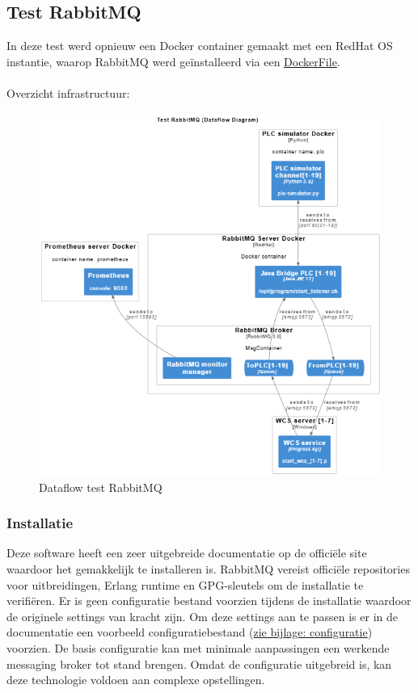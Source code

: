 \subsection{Test RabbitMQ}
In deze test werd opnieuw een Docker container gemaakt met een RedHat OS instantie, waarop RabbitMQ 
werd geïnstalleerd via een \hyperref[listing:docker_rabbitmq]{DockerFile}.
\\\\
Overzicht infrastructuur:
\begin{figure}[!h]
  \centering
  \includegraphics[width=.95\textwidth]{img/test-rabbitmq-dataflow.png}
  \caption{\label{fig:test_rabbitmq_dataflow}Dataflow test RabbitMQ}
\end{figure}

\subsubsection{Installatie}
Deze software heeft een zeer uitgebreide documentatie op de officiële site waardoor het gemakkelijk te installeren is.
RabbitMQ vereist officiële repositories voor uitbreidingen, Erlang runtime en GPG-sleutels om de installatie te verifiëren.
Er is geen configuratie bestand voorzien tijdens de installatie waardoor de originele settings van kracht zijn.
Om deze settings aan te passen is er in de documentatie een voorbeeld configuratiebestand (\hyperref[sec:config_rabbitmq]{zie bijlage: configuratie}) voorzien.
De basis configuratie kan met minimale aanpassingen een werkende messaging broker tot stand brengen.
Omdat de configuratie uitgebreid is, kan deze technologie voldoen aan complexe opstellingen.


